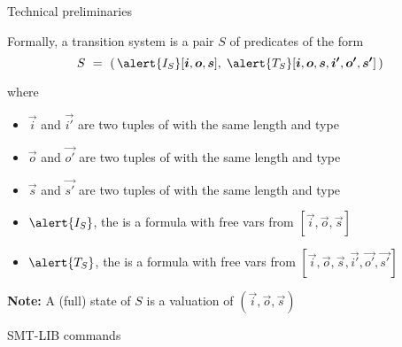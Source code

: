 \documentclass[10pt,aspectratio=149]{beamer}
\begin{document}
\begin{frame}{Technical preliminaries}

Formally, a transition system is a pair $S$ of predicates of the form
{\large
\[
 S \ = \ (\,
 \alert{I_S}[\vec i,\vec o,\vec s],\;
 \alert{T_S}[\vec i,\vec o,\vec s, \vec{i'},\vec{o'},\vec{s'}]\,
 )
\]
}
\pause

where 
\begin{itemize}
\item 
$\vec i$ and $\vec{i'}$ are two tuples of  with the same length and type
\item 
$\vec o$ and $\vec{o'}$ are two tuples of  with the same length and type
\item 
$\vec s$ and $\vec{s'}$ are two tuples of  with the same length and type
\item 
$\alert{I_S}$, the  is a formula with free vars from $[\vec i,\vec o,\vec s]$ 
\item
$\alert{T_S}$, the  is a formula with free vars from $[\vec i,\vec o,\vec s, \vec{i'},\vec{o'},\vec{s'}]$
\end{itemize}
\bigskip

\pause
\textbf{Note:}
A (full) state of $S$ is a valuation of $(\vec i,\vec o,\vec s)$
\end{frame}


\begin{frame}[t]{SMT-LIB commands}
\vspace{5ex}



\end{frame}
\end{document}
